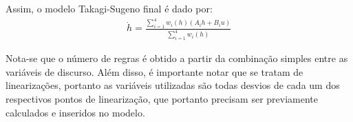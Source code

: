 \begin{itemize}
	Assim, o modelo Takagi-Sugeno final é dado por:
	\begin{align*}
		\dot{h} = \frac{\sum_{i=1}^{4}  w_i(h)(A_ih + B_i u)}{\sum_{i=1}^{4} w_i(h)}
	\end{align*}
	
	Nota-se que o número de regras é obtido a partir da combinação simples entre as variáveis de discurso. Além disso, é importante notar que se tratam de linearizações, portanto as variáveis utilizadas são todas desvios de cada um dos respectivos pontos de linearização, que portanto precisam ser previamente calculados e inseridos no modelo.
	
\end{itemize}

%


